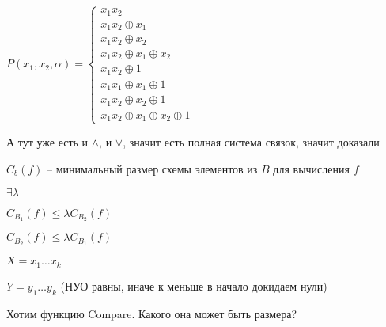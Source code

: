 \documentclass[12pt]{article}
\begin{document}
$P(x_1, x_2, \alpha) = \begin{cases}
    x_1x_2 \\
    x_1x_2 \oplus x_1 \\
    x_1x_2 \oplus x_2 \\
    x_1x_2 \oplus x_1 \oplus x_2 \\
    x_1x_2 \oplus 1 \\
    x_1x_1 \oplus x_1 \oplus 1 \\
    x_1x_2 \oplus x_2 \oplus 1 \\
    x_1x_2 \oplus x_1 \oplus x_2 \oplus 1
\end{cases}$

А тут уже есть и $\land$, и $\lor$, значит есть полная система связок, значит доказали

\begin{defin}{}
    $C_b(f)$ -- минимальный размер схемы элементов из $B$ для вычисления $f$
\end{defin}

\begin{Remark}{}
    $\exists \lambda$

    $C_{B_1}(f) \leq \lambda C_{B_2}(f)$

    $C_{B_2}(f) \leq \lambda C_{B_1}(f)$
\end{Remark}

\begin{nota}{}
    $X = x_1 \ldots x_k$

    $Y = y_1 \ldots y_k$ (НУО равны, иначе к меньше в начало докидаем нули)

    Хотим функцию Compare. Какого она может быть размера?
\end{nota}
\end{document}
